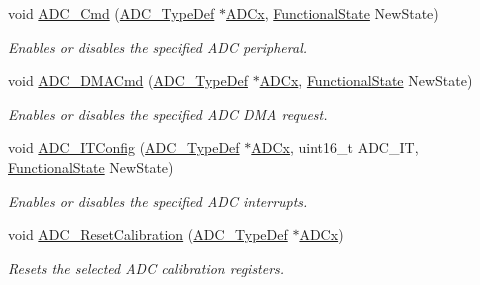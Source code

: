 \begin{DoxyCompactItemize}
void \mbox{\hyperlink{group___a_d_c___exported___functions_ga40882d399e3371755ed610c1134e634e}{A\+D\+C\+\_\+\+Cmd}} (\mbox{\hyperlink{struct_a_d_c___type_def}{A\+D\+C\+\_\+\+Type\+Def}} $\ast$\mbox{\hyperlink{group___s_t_m32_f1_x_x___n_u_c_l_e_o___l_o_w___l_e_v_e_l___exported___constants_gab44c1065d38c298955fc028346984340}{A\+D\+Cx}}, \mbox{\hyperlink{group___exported__types_gac9a7e9a35d2513ec15c3b537aaa4fba1}{Functional\+State}} New\+State)
\begin{DoxyCompactList}\small\item\em Enables or disables the specified A\+DC peripheral. \end{DoxyCompactList}\item 
void \mbox{\hyperlink{group___a_d_c___exported___functions_gac5881d5995818001584b27b137a8dbcb}{A\+D\+C\+\_\+\+D\+M\+A\+Cmd}} (\mbox{\hyperlink{struct_a_d_c___type_def}{A\+D\+C\+\_\+\+Type\+Def}} $\ast$\mbox{\hyperlink{group___s_t_m32_f1_x_x___n_u_c_l_e_o___l_o_w___l_e_v_e_l___exported___constants_gab44c1065d38c298955fc028346984340}{A\+D\+Cx}}, \mbox{\hyperlink{group___exported__types_gac9a7e9a35d2513ec15c3b537aaa4fba1}{Functional\+State}} New\+State)
\begin{DoxyCompactList}\small\item\em Enables or disables the specified A\+DC D\+MA request. \end{DoxyCompactList}\item 
void \mbox{\hyperlink{group___a_d_c___exported___functions_gad4c84b54b539944f555488bf979f82b6}{A\+D\+C\+\_\+\+I\+T\+Config}} (\mbox{\hyperlink{struct_a_d_c___type_def}{A\+D\+C\+\_\+\+Type\+Def}} $\ast$\mbox{\hyperlink{group___s_t_m32_f1_x_x___n_u_c_l_e_o___l_o_w___l_e_v_e_l___exported___constants_gab44c1065d38c298955fc028346984340}{A\+D\+Cx}}, uint16\+\_\+t A\+D\+C\+\_\+\+IT, \mbox{\hyperlink{group___exported__types_gac9a7e9a35d2513ec15c3b537aaa4fba1}{Functional\+State}} New\+State)
\begin{DoxyCompactList}\small\item\em Enables or disables the specified A\+DC interrupts. \end{DoxyCompactList}\item 
void \mbox{\hyperlink{group___a_d_c___exported___functions_ga3d542020ba28c1d16238a0defbee6d8f}{A\+D\+C\+\_\+\+Reset\+Calibration}} (\mbox{\hyperlink{struct_a_d_c___type_def}{A\+D\+C\+\_\+\+Type\+Def}} $\ast$\mbox{\hyperlink{group___s_t_m32_f1_x_x___n_u_c_l_e_o___l_o_w___l_e_v_e_l___exported___constants_gab44c1065d38c298955fc028346984340}{A\+D\+Cx}})
\begin{DoxyCompactList}\small\item\em Resets the selected A\+DC calibration registers. \end{DoxyCompactList}\item 

\end{DoxyCompactItemize}
